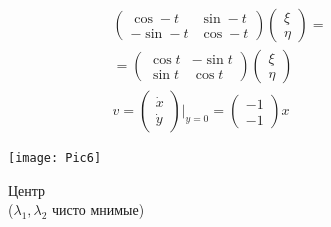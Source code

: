 \begin{figure}[!h]
\begin{minipage}[h]{0.49\linewidth}
\begin{gather*}
\begin{pmatrix}
				\cos -t & \sin -t \\
				-\sin -t & \cos -t
			\end{pmatrix}
			\begin{pmatrix}
				\xi \\ \eta
			\end{pmatrix}
			= \\ =
			\begin{pmatrix}
				\cos t & -\sin t\\
				\sin t & \cos t
			\end{pmatrix}
			\begin{pmatrix}
				\xi \\ \eta
			\end{pmatrix}\\
			v = 
			\begin{pmatrix}
				\dot{x} \\ \dot{y}
			\end{pmatrix}
			|_{y = 0} =
			\begin{pmatrix}
				-1 \\ -1
			\end{pmatrix}x
		\end{gather*}
	\end{minipage}
	\begin{minipage}[h]{0.49\linewidth}
		\texttt{[image: Pic6]}
		\caption{Центр \\ ($\lambda_1, \lambda_2$ чисто мнимые)}
	\end{minipage}
\end{figure}


\newpage
